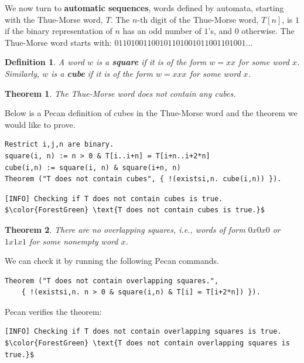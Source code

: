\documentclass[landscape,usenames,dvipsnames]{sciposter}
\newtheorem{thm}{Theorem}%
\newtheorem*{defin}{Definition}
\begin{document}
\begin{multicols}{3}
We now turn to \textbf{automatic sequences}, words defined by automata, starting with the Thue-Morse word, $T$. 
The $n$-th digit of the Thue-Morse word, $T[n]$, is $1$ if the binary representation of $n$ has an odd number of $1$'s, and $0$ otherwise.
The Thue-Morse word starts with: $01101001100101101001011001101001\ldots$

\begin{defin}
    A word $w$ is a \textbf{square} if it is of the form $w = xx$ for some word $x$.
    Similarly, $w$ is a \textbf{cube} if it is of the form $w = xxx$ for some word $x$.
\end{defin}

\begin{mdframed}[style=MyFrame]
\begin{thm}
    The Thue-Morse word does not contain any cubes.
\end{thm}
\end{mdframed}

Below is a Pecan definition of cubes in the Thue-Morse word and the theorem we would like to prove.
\begin{lstlisting}[language=pecan, basicstyle=\normalsize\ttfamily, mathescape=true, frame=single]
Restrict i,j,n are binary.
square(i, n) := n > 0 & T[i..i+n] = T[i+n..i+2*n]
cube(i,n) := square(i, n) & square(i+n, n)
Theorem ("T does not contain cubes", { !(existsi,n. cube(i,n)) }).
\end{lstlisting}

\begin{lstlisting}[basicstyle=\normalsize\ttfamily, mathescape=true, frame=single]
[INFO] Checking if T does not contain cubes is true.
$\color{ForestGreen} \text{T does not contain cubes is true.}$
\end{lstlisting}

\begin{mdframed}[style=MyFrame]
\begin{thm}
There are no overlapping squares, i.e., words of form $0x0x0$ or $1x1x1$ for some nonempty word $x$. 
\end{thm}
\end{mdframed}

We can check it by running the following Pecan commands.

\begin{lstlisting}[language=pecan, basicstyle=\normalsize\ttfamily, mathescape=true, frame=single]
Theorem ("T does not contain overlapping squares.", 
    { !(existsi,n. n > 0 & square(i,n) & T[i] = T[i+2*n]) }).
\end{lstlisting}
Pecan verifies the theorem: 
\begin{lstlisting}[basicstyle=\normalsize\ttfamily, mathescape=true, frame=single]
[INFO] Checking if T does not contain overlapping squares is true.
$\color{ForestGreen} \text{T does not contain overlapping squares is true.}$
\end{lstlisting}


\end{multicols}
\end{document}

